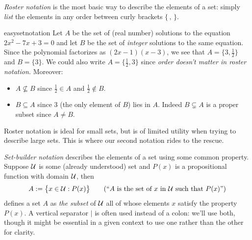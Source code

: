 
\emph{Roster notation} is the most basic way to describe the elements of a set: simply \emph{list} the elements in any order between curly brackets $\{\,,\,\}$.

\begin{example}{}{easysetnotation}
	Let $A$ be the set of (real number) solutions to the equation $2x^2-7x+3=0$ and let $B$ be the set of \emph{integer} solutions to the same equation. Since the polynomial factorizes as $(2x-1)(x-3)$, we see that $A=\{3,\frac 12\}$ and $B=\{3\}$. We could also write $A=\{\frac 12,3\}$ since \emph{order doesn't matter in roster notation.}	Moreover:
	\begin{itemize}
	  \item $A\nsubseteq B$ since $\frac 12\in A$ and $\frac 12\notin B$.
	  \item $B\subseteq A$ since 3 (the only element of $B$) lies in $A$. Indeed $B\subsetneq A$ is a  proper subset since $A\neq B$.
	\end{itemize}
\end{example}

Roster notation is ideal for small sets, but is of limited utility when trying to describe large sets. This is where our second notation rides to the rescue.\bigbreak

\emph{Set-builder notation} describes the elements of a set using some common property. Suppose $\mathcal{U}$ is some (already understood) set and $P(x)$ is a propositional function with domain $\mathcal{U}$, then
\[
	A:=\bigl\{x\in\cU:P(x)\bigr\} \tag{``$A$ is the set of $x$ in $\cU$ such that $P(x)$''}
\]
defines a set $A$ as \emph{the subset} of $\mathcal{U}$ all of whose elements $x$ satisfy the property $P(x)$. A vertical separator $\mid$ is often used instead of a colon: we'll use both, though it might be essential in a given context to use one rather than the other for clarity.

